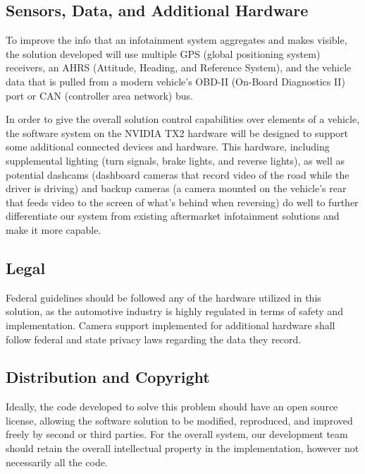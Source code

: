 \documentclass[onecolumn, draftclsnofoot,10pt, compsoc]{IEEEtran}
\begin{document}
\subsection{Sensors, Data, and Additional Hardware}
To improve the info that an infotainment system aggregates and makes visible, the solution developed will use multiple GPS (global positioning system) receivers, an AHRS (Attitude, Heading, and Reference System), and the vehicle data that is pulled from a modern vehicle's OBD-II (On-Board Diagnostics II) port or CAN (controller area network) bus.\par
In order to give the overall solution control capabilities over elements of a vehicle, the software system on the NVIDIA TX2 hardware will be designed to support some additional connected devices and hardware. This hardware, including supplemental lighting (turn signals, brake lights, and reverse lights), as well as potential dashcams (dashboard cameras that record video of the road while the driver is driving) and backup cameras (a camera mounted on the vehicle's rear that feeds video to the screen of what's behind when reversing) do well to further differentiate our system from existing aftermarket infotainment solutions and make it more capable.\par

\subsection{Legal}
Federal guidelines should be followed any of the hardware utilized in this solution, as the automotive industry is highly regulated in terms of safety and implementation. Camera support implemented for additional hardware shall follow federal and state privacy laws regarding the data they record.\par

\subsection{Distribution and Copyright}
Ideally, the code developed to solve this problem should have an open source license, allowing the software solution to be modified, reproduced, and improved freely by second or third parties. For the overall system, our development team should retain the overall intellectual property in the implementation, however not necessarily all the code.\par
\end{document}
